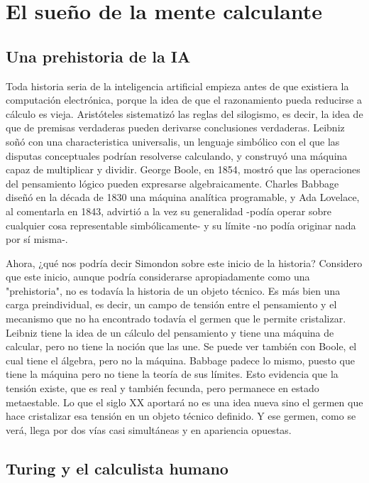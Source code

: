 \renewcommand{\thesection}{\arabic{section}}
\section{El sueño de la mente calculante}

\let\oldthesubsection\thesubsection
\renewcommand{\thesubsection}{\Roman{subsection}}
\subsection{Una prehistoria de la IA}

Toda historia seria de la inteligencia artificial empieza antes de que existiera la computación electrónica, porque la idea de que el razonamiento pueda reducirse a cálculo es vieja. Aristóteles sistematizó las reglas del silogismo, es decir, la idea de que de premisas verdaderas pueden derivarse conclusiones verdaderas. Leibniz soñó con una characteristica universalis, un lenguaje simbólico con el que las disputas conceptuales podrían resolverse calculando, y construyó una máquina capaz de multiplicar y dividir. George Boole, en 1854, mostró que las operaciones del pensamiento lógico pueden expresarse algebraicamente. Charles Babbage diseñó en la década de 1830 una máquina analítica programable, y Ada Lovelace, al comentarla en 1843, advirtió a la vez su generalidad -podía operar sobre cualquier cosa representable simbólicamente- y su límite -no podía originar nada por sí misma-.

Ahora, ¿qué nos podría decir Simondon sobre este inicio de la historia? Considero que este inicio, aunque podría considerarse apropiadamente como una "prehistoria", no es todavía la historia de un objeto técnico. Es más bien una carga preindividual, es decir, un campo de tensión entre el pensamiento y el mecanismo que no ha encontrado todavía el germen que le permite cristalizar. Leibniz tiene la idea de un cálculo del pensamiento y tiene una máquina de calcular, pero no tiene la noción que las une. Se puede ver también con Boole, el cual tiene el álgebra, pero no la máquina. Babbage padece lo mismo, puesto que tiene la máquina pero no tiene la teoría de sus límites. Esto evidencia que la tensión existe, que es real y también fecunda, pero permanece en estado metaestable. Lo que el siglo XX aportará no es una idea nueva sino el germen que hace cristalizar esa tensión en un objeto técnico definido. Y ese germen, como se verá, llega por dos vías casi simultáneas y en apariencia opuestas.

\subsection{Turing y el calculista humano}

